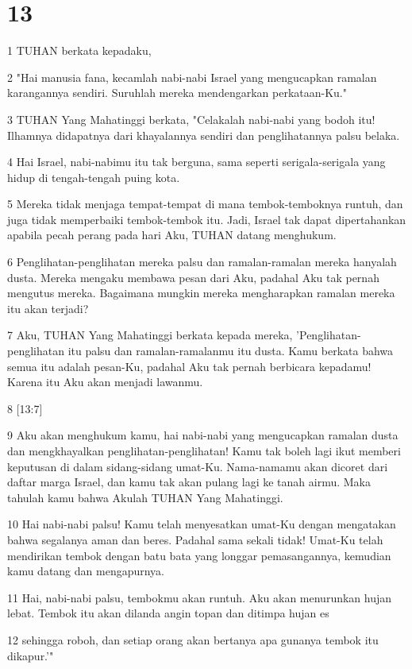 \chapter{13}

\par 1 TUHAN berkata kepadaku,
\par 2 "Hai manusia fana, kecamlah nabi-nabi Israel yang mengucapkan ramalan karangannya sendiri. Suruhlah mereka mendengarkan perkataan-Ku."
\par 3 TUHAN Yang Mahatinggi berkata, "Celakalah nabi-nabi yang bodoh itu! Ilhamnya didapatnya dari khayalannya sendiri dan penglihatannya palsu belaka.
\par 4 Hai Israel, nabi-nabimu itu tak berguna, sama seperti serigala-serigala yang hidup di tengah-tengah puing kota.
\par 5 Mereka tidak menjaga tempat-tempat di mana tembok-temboknya runtuh, dan juga tidak memperbaiki tembok-tembok itu. Jadi, Israel tak dapat dipertahankan apabila pecah perang pada hari Aku, TUHAN datang menghukum.
\par 6 Penglihatan-penglihatan mereka palsu dan ramalan-ramalan mereka hanyalah dusta. Mereka mengaku membawa pesan dari Aku, padahal Aku tak pernah mengutus mereka. Bagaimana mungkin mereka mengharapkan ramalan mereka itu akan terjadi?
\par 7 Aku, TUHAN Yang Mahatinggi berkata kepada mereka, 'Penglihatan-penglihatan itu palsu dan ramalan-ramalanmu itu dusta. Kamu berkata bahwa semua itu adalah pesan-Ku, padahal Aku tak pernah berbicara kepadamu! Karena itu Aku akan menjadi lawanmu.
\par 8 [13:7]
\par 9 Aku akan menghukum kamu, hai nabi-nabi yang mengucapkan ramalan dusta dan mengkhayalkan penglihatan-penglihatan! Kamu tak boleh lagi ikut memberi keputusan di dalam sidang-sidang umat-Ku. Nama-namamu akan dicoret dari daftar marga Israel, dan kamu tak akan pulang lagi ke tanah airmu. Maka tahulah kamu bahwa Akulah TUHAN Yang Mahatinggi.
\par 10 Hai nabi-nabi palsu! Kamu telah menyesatkan umat-Ku dengan mengatakan bahwa segalanya aman dan beres. Padahal sama sekali tidak! Umat-Ku telah mendirikan tembok dengan batu bata yang longgar pemasangannya, kemudian kamu datang dan mengapurnya.
\par 11 Hai, nabi-nabi palsu, tembokmu akan runtuh. Aku akan menurunkan hujan lebat. Tembok itu akan dilanda angin topan dan ditimpa hujan es
\par 12 sehingga roboh, dan setiap orang akan bertanya apa gunanya tembok itu dikapur.'"
